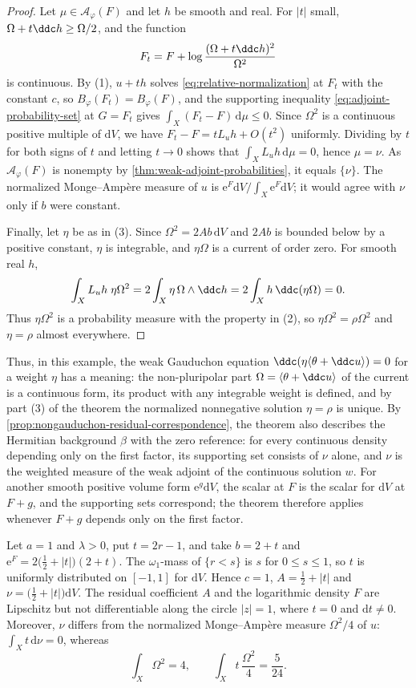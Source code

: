 \begin{proof}
Let $\mu\in\mathcal A_\varphi(F)$ and let $h$ be smooth and real. For $|t|$ small, $\Omega+t\ddc h\geq\Omega/2$, and the function
\[
 F_t=F+\log\frac{(\Omega+t\ddc h)^2}{\Omega^2}
\]
is continuous. By (1), $u+th$ solves \eqref{eq:relative-normalization} at $F_t$ with the constant $c$, so $B_\varphi(F_t)=B_\varphi(F)$, and the supporting inequality \eqref{eq:adjoint-probability-set} at $G=F_t$ gives $\int_X(F_t-F)\,\mathrm d\mu\leq0$. Since $\Omega^2$ is a continuous positive multiple of $\mathrm dV$, we have $F_t-F=tL_uh+O(t^2)$ uniformly. Dividing by $t$ for both signs of $t$ and letting $t\to0$ shows that $\int_XL_uh\,\mathrm d\mu=0$, hence $\mu=\nu$. As $\mathcal A_\varphi(F)$ is nonempty by \cref{thm:weak-adjoint-probabilities}, it equals $\{\nu\}$. The normalized Monge--Amp\`ere measure of $u$ is $\mathrm e^F\mathrm dV/\int_X\mathrm e^F\mathrm dV$; it would agree with $\nu$ only if $b$ were constant.

Finally, let $\eta$ be as in (3). Since $\Omega^2=2Ab\,\mathrm dV$ and $2Ab$ is bounded below by a positive constant, $\eta$ is integrable, and $\eta\Omega$ is a current of order zero. For smooth real $h$,
\[
 \int_XL_uh\;\eta\Omega^2=2\int_X\eta\,\Omega\wedge\ddc h
 =2\int_Xh\,\ddc(\eta\Omega)=0.
\]
Thus $\eta\Omega^2$ is a probability measure with the property in (2), so $\eta\Omega^2=\rho\Omega^2$ and $\eta=\rho$ almost everywhere.
\end{proof}

Thus, in this example, the weak Gauduchon equation $\ddc(\eta\langle\theta+\ddc u\rangle)=0$ for a weight $\eta$ has a meaning: the non-pluripolar part $\Omega=\langle\theta+\ddc u\rangle$ of the current is a continuous form, its product with any integrable weight is defined, and by part (3) of the theorem the normalized nonnegative solution $\eta=\rho$ is unique. By \cref{prop:nongauduchon-residual-correspondence}, the theorem also describes the Hermitian background $\beta$ with the zero reference: for every continuous density depending only on the first factor, its supporting set consists of $\nu$ alone, and $\nu$ is the weighted measure of the weak adjoint of the continuous solution $w$. For another smooth positive volume form $\mathrm e^g\mathrm dV$, the scalar at $F$ is the scalar for $\mathrm dV$ at $F+g$, and the supporting sets correspond; the theorem therefore applies whenever $F+g$ depends only on the first factor.

\begin{example}\label{ex:nongauduchon-lipschitz-residual}
Let $a=1$ and $\lambda>0$, put $t=2r-1$, and take $b=2+t$ and $\mathrm e^F=2\bigl(\tfrac12+|t|\bigr)(2+t)$. The $\omega_1$-mass of $\{r<s\}$ is $s$ for $0\leq s\leq1$, so $t$ is uniformly distributed on $[-1,1]$ for $\mathrm dV$. Hence $c=1$, $A=\tfrac12+|t|$ and $\nu=\bigl(\tfrac12+|t|\bigr)\mathrm dV$. The residual coefficient $A$ and the logarithmic density $F$ are Lipschitz but not differentiable along the circle $|z|=1$, where $t=0$ and $\mathrm dt\ne0$. Moreover, $\nu$ differs from the normalized Monge--Amp\`ere measure $\Omega^2/4$ of $u$: $\int_Xt\,\mathrm d\nu=0$, whereas
\[
 \int_X\Omega^2=4,\qquad\int_Xt\,\frac{\Omega^2}4=\frac5{24}.
\]
\end{example}

